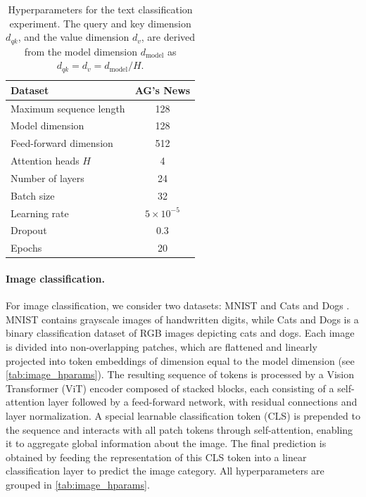 \documentclass{article}
\theoremstyle{definition}
\theoremstyle{plain}
\begin{document}
\begin{appendices}
\begin{table}[th]
\centering
\caption{Hyperparameters for the text classification experiment. The query and key dimension $d_{qk}$, and the value dimension $d_v$, are derived from the model dimension $d_{\text{model}}$ as $d_{qk} = d_v = d_{\text{model}} / H$.}
\label{tab:text_hparams}
\begin{tabular}{lc}
\toprule
Dataset & AG’s News \\
\midrule
Maximum sequence length & 128 \\
Model dimension & 128 \\
Feed-forward dimension & 512 \\
Attention heads $H$ & 4 \\
Number of layers & 24 \\
Batch size & 32 \\
Learning rate & $5\times10^{-5}$ \\
Dropout & 0.3 \\
Epochs & 20 \\
\bottomrule
\end{tabular}
\end{table}

\paragraph{Image classification.}
For image classification, we consider two datasets: MNIST \cite{mnist} and Cats and Dogs \cite{dogs_vs_cats}. MNIST contains grayscale images of handwritten digits, while Cats and Dogs is a binary classification dataset of RGB images depicting cats and dogs. Each image is divided into non-overlapping patches, which are flattened and linearly projected into token embeddings of dimension equal to the model dimension (see \cref{tab:image_hparams}). The resulting sequence of tokens is processed by a Vision Transformer (ViT) encoder composed of stacked blocks, each consisting of a self-attention layer followed by a feed-forward network, with residual connections and layer normalization. A special learnable classification token (CLS) is prepended to the sequence and interacts with all patch tokens through self-attention, enabling it to aggregate global information about the image. The final prediction is obtained by feeding the representation of this CLS token into a linear classification layer to predict the image category. All hyperparameters are grouped in \cref{tab:image_hparams}.


\end{appendices}
\end{document}

